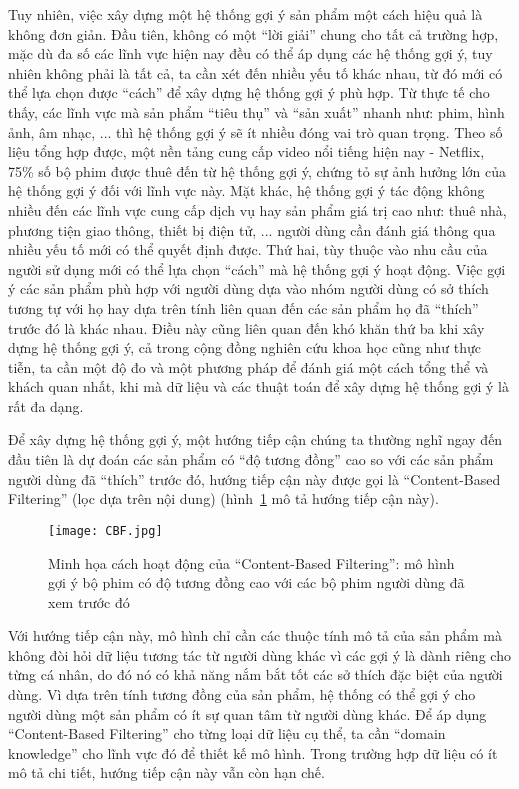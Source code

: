 Tuy nhiên, việc xây dựng một hệ thống gợi ý sản phẩm một cách hiệu quả là không đơn giản.
Đầu tiên, không có một ``lời giải'' chung cho tất cả trường hợp,
mặc dù đa số các lĩnh vực hiện nay đều có thể áp dụng các hệ thống gợi ý, tuy nhiên không phải là tất cả,
ta cần xét đến nhiều yếu tố khác nhau, 
từ đó mới có thể lựa chọn được ``cách'' để xây dựng hệ thống gợi ý phù hợp. %
Từ thực tế cho thấy, các lĩnh vực mà sản phẩm ``tiêu thụ'' và ``sản xuất'' nhanh như: phim, hình ảnh, âm nhạc, ... 
thì hệ thống gợi ý sẽ ít nhiều đóng vai trò quan trọng. 
Theo số liệu tổng hợp được, một nền tảng cung cấp video nổi tiếng hiện nay - Netflix,
75\% số bộ phim được thuê đến từ hệ thống gợi ý, chứng tỏ sự ảnh hưởng lớn của hệ thống gợi ý đối với lĩnh vực này. 
Mặt khác, hệ thống gợi ý tác động không nhiều đến các lĩnh vực cung cấp dịch vụ hay sản phẩm giá trị cao như:
thuê nhà, phương tiện giao thông, thiết bị điện tử, ... người dùng cần đánh giá thông qua nhiều yếu tố mới có thể quyết định được. 
Thứ hai, tùy thuộc vào nhu cầu của người sử dụng mới có thể lựa chọn ``cách'' mà hệ thống gợi ý hoạt động.
Việc gợi ý các sản phẩm phù hợp với người dùng dựa vào nhóm người dùng có sở thích tương tự với họ 
hay dựa trên tính liên quan đến các sản phẩm họ đã ``thích'' trước đó là khác nhau. 
Điều này cũng liên quan đến khó khăn thứ ba khi xây dựng hệ thống gợi ý, cả trong cộng đồng nghiên cứu khoa học cũng như thực tiễn, 
ta cần một độ đo và một phương pháp để đánh giá một cách tổng thể và khách quan nhất, 
khi mà dữ liệu và các thuật toán để xây dựng hệ thống gợi ý là rất đa dạng.

Để xây dựng hệ thống gợi ý, một hướng tiếp cận chúng ta thường nghĩ ngay đến đầu tiên
là dự đoán các sản phẩm có ``độ tương đồng'' cao so với các sản phẩm người dùng đã ``thích'' trước đó,
hướng tiếp cận này được gọi là ``Content-Based Filtering'' (lọc dựa trên nội dung) (hình~\ref{fig_CBF} mô tả hướng tiếp cận này).
\begin{figure}
    \centering
	\texttt{[image: CBF.jpg]}
    \caption{Minh họa cách hoạt động của ``Content-Based Filtering'':
    mô hình gợi ý bộ phim có độ tương đồng cao với các bộ phim
    người dùng đã xem trước đó}
    \label{fig_CBF}
\end{figure}
Với hướng tiếp cận này, mô hình chỉ cần các thuộc tính mô tả của sản phẩm mà 
không đòi hỏi dữ liệu tương tác từ người dùng khác
vì các gợi ý là dành riêng cho từng cá nhân, do đó nó có khả năng nắm bắt tốt các sở thích
đặc biệt của người dùng.
Vì dựa trên tính tương đồng của sản phẩm, hệ thống có thể gợi ý cho người dùng một sản phẩm có ít sự quan tâm từ người dùng khác.
Để áp dụng ``Content-Based Filtering'' cho từng loại dữ liệu cụ thể,
ta cần ``domain knowledge'' cho lĩnh vực đó để thiết kế mô hình.
Trong trường hợp dữ liệu có ít mô tả chi tiết, hướng tiếp cận này vẫn còn hạn chế.

